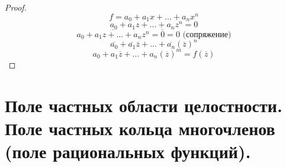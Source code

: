 \documentclass[12pt, fleqn]{article}
\begin{document}
    \begin{proof} 
        \[f = a_0 + a_1 x + ... + a_n x^n\]
        \[a_0 + a_1z + ... + a_n z^n = 0\]
        \[\overline{a_0 + a_1 z + ... + a_n z^n} = \overline{0} = 0 \text{ (сопряжение)} \]
        \[\overline{a_0}  +\overline{a_1} \overline{z} + ... + \overline{a_n}  (\overline{z})^n\]
        \[a_0 + a_1\overline{z} + ... + a_n (\overline{z})^m = f(\overline{z})\]
    \end{proof}



\section{Поле частных области целостности. Поле частных кольца многочленов \\(поле рациональных функций).}
    
\end{document}
